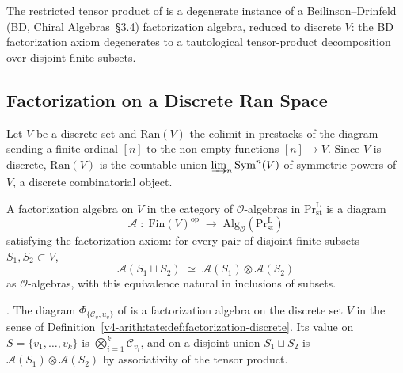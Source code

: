 The restricted tensor product of
 is a degenerate instance
of a Beilinson--Drinfeld (BD, Chiral Algebras~\S3.4) factorization
algebra, reduced to discrete \(V\): the BD factorization axiom
degenerates to a tautological tensor-product decomposition over
disjoint finite subsets.

\subsection{Factorization on a Discrete Ran Space}

\begin{setup}
\label{v4-arith:tate:setup:ran-discrete}
Let \(V\) be a discrete set and \(\mathrm{Ran}(V)\) the colimit in
prestacks of the diagram sending a finite ordinal \([n]\) to the
non-empty functions \([n]\to V\). Since \(V\) is discrete,
\(\mathrm{Ran}(V)\) is the countable union
\(\varinjlim_{n}\mathrm{Sym}^{n}(V)\) of symmetric powers of \(V\), a
discrete combinatorial object.
\end{setup}

\begin{definition}
\label{v4-arith:tate:def:factorization-discrete}
A factorization algebra on \(V\) in the category of
\(\mathcal{O}\)-algebras in \(\mathrm{Pr}^{\mathrm{L}}_{\mathrm{st}}\)
is a diagram
\[
\mathcal{A}\;:\;\mathrm{Fin}(V)^{\mathrm{op}}\;\longrightarrow\;\mathrm{Alg}_{\mathcal{O}}(\mathrm{Pr}^{\mathrm{L}}_{\mathrm{st}})
\]
satisfying the factorization axiom: for every pair of disjoint
finite subsets \(S_{1},S_{2}\subset V\),
\[
\mathcal{A}(S_{1}\sqcup S_{2})\;\simeq\;\mathcal{A}(S_{1})\otimes\mathcal{A}(S_{2})
\]
as \(\mathcal{O}\)-algebras, with this equivalence natural in inclusions
of subsets.
\end{definition}

\begin{theorem}
\label{v4-arith:tate:thm:BD-automatic-discrete}
\ClaimStatusProvedHere. The diagram
\(\Phi_{\{\mathcal{C}_{v},u_{v}\}}\) of
 is a factorization algebra on
the discrete set \(V\) in the sense of
Definition~\ref{v4-arith:tate:def:factorization-discrete}. Its value
on \(S=\{v_{1},\ldots,v_{k}\}\) is
\(\bigotimes_{i=1}^{k}\mathcal{C}_{v_{i}}\), and on a disjoint union
\(S_{1}\sqcup S_{2}\) is
\(\mathcal{A}(S_{1})\otimes\mathcal{A}(S_{2})\) by associativity of
the tensor product.
\end{theorem}

